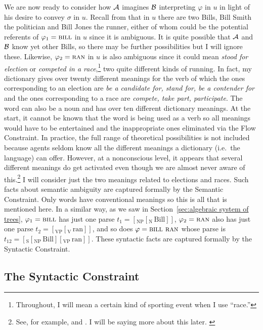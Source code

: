 We are now ready to consider how $\cal A$ imagines $\cal B$ interpreting $\varphi$ in $u$ in light of his desire to convey $\sigma$ in $u$. Recall from  that in $u$ there are two Bills, Bill Smith the politician and Bill Jones the runner, either of whom could be the potential referents of $\varphi_1 = \Expression{Bill}$ in $u$ since it is ambiguous. It is quite possible that $\cal A$ and $\cal B$ know yet other Bills, so there may be further possibilities but I will ignore these. Likewise, $\varphi_2 = \Expression{ran}$ in $u$ is also ambiguous since it could mean \emph{stood for election} or \emph{competed in a race},\footnote{Throughout, I will mean a certain kind of sporting event when I use ``race.''} two quite different kinds of running. In fact, my dictionary gives over twenty different meanings for the verb  of which the ones corresponding to an election are \emph{be a candidate for, stand for, be a contender for} and the ones corresponding to a race are \emph{compete, take part, participate}. The word  can also be a noun and has over ten different dictionary meanings. At the start, it cannot be known that the word is being used as a verb so all meanings would have to be entertained and the inappropriate ones eliminated via the Flow Constraint. In practice, the full range of theoretical possibilities is not included because agents seldom know all the different meanings a dictionary (i.e.\ the language) can offer. However, at a nonconscious level, it appears that several different meanings do get activated even though we are almost never aware of this.\footnote{See, for example, \citet{os:aladsc} and \citet{kawamoto:ndrla}. I will be saying more about this later. \label{foot:alternative meaning activation}} I will consider just the two meanings related to elections and races. Such facts about semantic ambiguity are captured formally by the Semantic Constraint. Only words have conventional meanings so this is all that is mentioned here. In a similar way, as we saw in Section~\ref{sec:algebraic system of trees}, $\varphi_1 = \Expression{Bill}$ has just one parse $t_1 = [_{\mathrm{NP}} [_{\mathrm{N}}\, \mathrm{Bill}]]$, $\varphi_2 = \Expression{ran}$ also has just one parse $t_2 = [_{\mathrm{VP}}[_{\mathrm{V}}\, \mathrm{ran}]]$, and so does $\varphi = \Expression{Bill ran}$ whose parse is $t_{12} = [_{\mathrm{S}}[_{\mathrm{NP}}\, \mathrm{Bill}][_{\mathrm{VP}}\, \mathrm{ran}]]$. These syntactic facts are captured formally by the Syntactic Constraint.

\subsection{The Syntactic Constraint}

